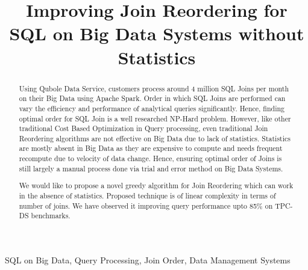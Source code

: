\documentclass[conference]{IEEEtran}
\begin{document}
\title{Improving Join Reordering for SQL on Big Data Systems without Statistics\\
}

\author{
\and
{}
}

\maketitle

\begin{abstract}
Using Qubole Data Service, customers process around 4 million SQL Joins per month on their Big Data using Apache Spark. Order in which SQL Joins are performed can vary the efficiency and performance of analytical queries significantly. Hence, finding optimal order for SQL Join is a well researched NP-Hard problem. However, like other traditional Cost Based Optimization in Query processing, even traditional Join Reordering algorithms are not effective on Big Data due to lack of statistics. Statistics are mostly absent in Big Data as they are expensive to compute and needs frequent recompute due to velocity of data change. Hence, ensuring optimal order of Joins is still largely a manual process done via trial and error method on Big Data Systems.

We would like to propose a novel greedy algorithm for Join Reordering which can work in the absence of statistics. Proposed technique is of linear complexity in terms of number of joins. We have observed it improving query performance upto 85\% on TPC-DS benchmarks.
\end{abstract}

\begin{IEEEkeywords}
SQL on Big Data, Query Processing, Join Order, Data Management Systems
\end{IEEEkeywords}
\end{document}
